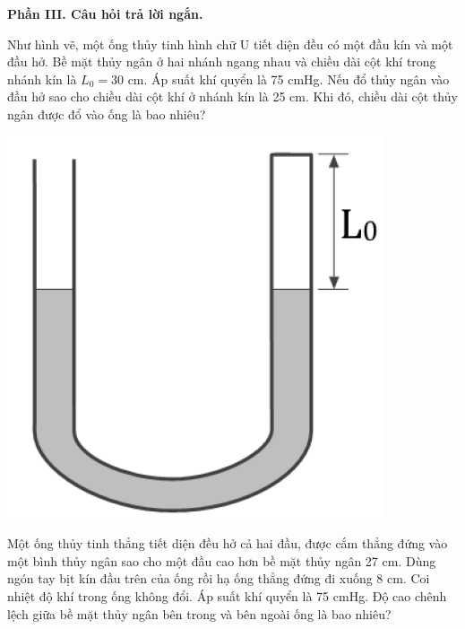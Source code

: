 \documentclass[12pt,a4paper]{article}
\begin{document}
\textbf{Phần III. Câu hỏi trả lời ngắn.}
\setcounter{ex}{0}
\begin{ex}
	Như hình vẽ, một ống thủy tinh hình chữ U tiết diện đều có một đầu kín và một đầu hở. Bề mặt thủy ngân ở hai nhánh ngang nhau và chiều dài cột khí trong nhánh kín là $L_0 = 30$ cm. Áp suất khí quyển là 75 cmHg. Nếu đổ thủy ngân vào đầu hở sao cho chiều dài cột khí ở nhánh kín là 25 cm. Khi đó, chiều dài cột thủy ngân được đổ vào ống là bao nhiêu?
		\begin{center}
		\includegraphics[scale=0.3]{img/11.png}
	\end{center}
\end{ex}

\begin{ex}
	Một ống thủy tinh thẳng tiết diện đều hở cả hai đầu, được cắm thẳng đứng vào một bình thủy ngân sao cho một đầu cao hơn bề mặt thủy ngân 27 cm. Dùng ngón tay bịt kín đầu trên của ống rồi hạ ống thẳng đứng đi xuống 8 cm. Coi nhiệt độ khí trong ống không đổi. Áp suất khí quyển là 75 cmHg. Độ cao chênh lệch giữa bề mặt thủy ngân bên trong và bên ngoài ống là bao nhiêu?
\end{ex}
\end{document}
